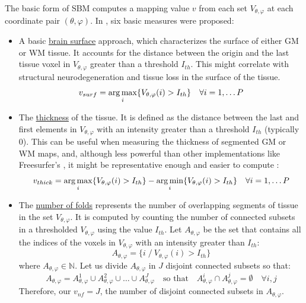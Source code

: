 The basic form of \ac{SBM} computes a mapping value $v$ from each set $V_{\theta,\varphi}$ at each coordinate pair $(\theta,\varphi)$. In \cite{Martinez-Murcia2014225,Martinez-Murcia2015}, six basic measures were proposed: 


\begin{itemize}
	\item A basic \underline{brain surface} approach, which characterizes the surface of either \ac{GM} or \ac{WM} tissue. It accounts for the distance between the origin and the last tissue voxel in $V_{\theta,\varphi}$ greater than a threshold $I_{th}$. This might correlate with structural neurodegeneration and tissue loss in the surface of the tissue. 
	\begin{equation}\label{eq:surface}
	v_{surf}= \operatorname*{arg\,max}_i \lbrace V_{\theta,\varphi}(i)>I_{th}\rbrace \quad \forall i=1,\dots P
	\end{equation}  
	
	\item The \underline{thickness} of the tissue. It is defined as the distance between the last and first elements in $V_{\theta,\varphi}$
	with an intensity greater than a threshold $I_{th}$ (typically 0). This can be useful when measuring the thickness of segmented \ac{GM} or \ac{WM} maps, and, although less powerful than other implementations like Freesurfer's \cite{Dale1999}, it might be representative enough and easier to compute : 
	\begin{equation}\label{eq:thickness}
	v_{thick}=\operatorname*{arg\,max}_i \lbrace V_{\theta,\varphi}(i)>I_{th}\rbrace- \operatorname*{arg\,min}_i \lbrace V_{\theta,\varphi}(i)>I_{th}\rbrace
	\quad \forall i=1,\dots P
	\end{equation}  
	
	\item The \underline{number of folds} represents the number of overlapping segments of tissue in the set $V_{\theta,\varphi}$. It is computed by counting the number of connected subsets in a thresholded $V_{\theta,\varphi}$ using the value $I_{th}$. Let $A_{\theta,\varphi}$ be the set that contains all the indices of the voxels in $V_{\theta,\varphi}$ with an intensity greater than $I_{th}$:
	\begin{equation}
	A_{\theta,\varphi} = \lbrace i \; / \: V_{\theta,\varphi}(i)>I_{th} \rbrace
	\end{equation}
	where $A_{\theta,\varphi} \in \mathbb{N}$. Let us divide $A_{\theta,\varphi}$ in $J$ disjoint connected subsets so that:
	\begin{equation}
	A_{\theta,\varphi} = A_{\theta,\varphi}^1 \cup A_{\theta,\varphi}^2 \cup \dots \cup A_{\theta,\varphi}^J \quad \text{so that} \quad A_{\theta,\varphi}^i \cap A_{\theta,\varphi}^j = \emptyset \quad \forall i,j
	\end{equation}
	Therefore, our $v_{nf}=J$, the number of disjoint connected subsets in $A_{\theta,\varphi}$.
	

\end{itemize}
